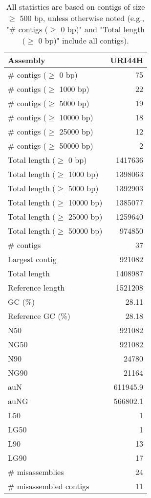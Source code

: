 \documentclass[12pt,a4paper]{article}
\begin{document}
\begin{table}[ht]
\begin{center}
\caption{All statistics are based on contigs of size $\geq$ 500 bp, unless otherwise noted (e.g., "\# contigs ($\geq$ 0 bp)" and "Total length ($\geq$ 0 bp)" include all contigs).}
\begin{tabular}{|l*{1}{|r}|}
\hline
Assembly & URI44H \\ \hline
\# contigs ($\geq$ 0 bp) & 75 \\ \hline
\# contigs ($\geq$ 1000 bp) & 22 \\ \hline
\# contigs ($\geq$ 5000 bp) & 19 \\ \hline
\# contigs ($\geq$ 10000 bp) & 18 \\ \hline
\# contigs ($\geq$ 25000 bp) & 12 \\ \hline
\# contigs ($\geq$ 50000 bp) & 2 \\ \hline
Total length ($\geq$ 0 bp) & 1417636 \\ \hline
Total length ($\geq$ 1000 bp) & 1398063 \\ \hline
Total length ($\geq$ 5000 bp) & 1392903 \\ \hline
Total length ($\geq$ 10000 bp) & 1385077 \\ \hline
Total length ($\geq$ 25000 bp) & 1259640 \\ \hline
Total length ($\geq$ 50000 bp) & 974850 \\ \hline
\# contigs & 37 \\ \hline
Largest contig & 921082 \\ \hline
Total length & 1408987 \\ \hline
Reference length & 1521208 \\ \hline
GC (\%) & 28.11 \\ \hline
Reference GC (\%) & 28.18 \\ \hline
N50 & 921082 \\ \hline
NG50 & 921082 \\ \hline
N90 & 24780 \\ \hline
NG90 & 21164 \\ \hline
auN & 611945.9 \\ \hline
auNG & 566802.1 \\ \hline
L50 & 1 \\ \hline
LG50 & 1 \\ \hline
L90 & 13 \\ \hline
LG90 & 17 \\ \hline
\# misassemblies & 24 \\ \hline
\# misassembled contigs & 11 \\ \hline

\end{tabular}
\end{center}
\end{table}
\end{document}
